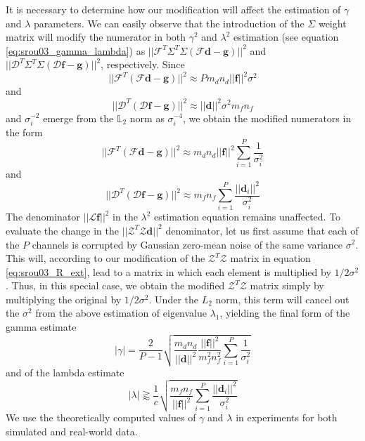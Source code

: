 \documentclass[12pt,notitlepage]{report}
\begin{document}
It is necessary to determine how our modification will affect the estimation of $\gamma$ and $\lambda$ parameters. We can easily observe that the introduction of the $\Sigma$ weight matrix will 
modify the numerator in both $\gamma^2$ and $\lambda^2$ estimation (see equation \ref{eq:srou03_gamma_lambda}) as $||\mathcal{F}^T \Sigma^T \Sigma( \mathcal{F} \mathbf{d} - \mathbf{g}) ||^2$ and $||\mathcal{D}^T \Sigma^T \Sigma( \mathcal{D} \mathbf{f} - \mathbf{g}) ||^2$, respectively. Since 
\begin{equation}
\label{eq:srou03_lambda_numer}
	||\mathcal{F}^T(\mathcal{F} \mathbf{d} - \mathbf{g}) ||^2 \approx P m_d n_d ||\mathbf{f}||^2 \sigma^2
\end{equation}
and 
\begin{equation}
\label{eq:srou03_gamma_numer}
	||\mathcal{D}^T (\mathcal{D} \mathbf{f} - \mathbf{g}) ||^2 \approx || \mathbf{d} ||^2 \sigma^2 m_f n_f
\end{equation}
and $\sigma_i^{-2}$ emerge from the $\mathbb{L}_2$ norm as $\sigma_i^{-4}$, we obtain the modified numerators in the form    
\begin{equation}
\label{eq:srou03_lambda_numer_ext}
	||\mathcal{F}^T(\mathcal{F} \mathbf{d} - \mathbf{g}) ||^2 \approx m_d n_d ||\mathbf{f}||^2 \sum_{i=1}^{P} \frac{1}{\sigma_i^2} 
\end{equation}
and 
\begin{equation}
\label{eq:srou03_gamma_numer_ext}
	||\mathcal{D}^T (\mathcal{D} \mathbf{f} - \mathbf{g}) ||^2 \approx  m_f n_f \sum_{i=1}^P \frac {|| \mathbf{d}_i ||^2}{ \sigma_i^2}
\end{equation}
The denominator $|| \mathcal{L} \mathbf{f} ||^2$ in the $\lambda^2$ estimation equation remains unaffected. To evaluate the change in the $|| \mathcal{Z}^T \mathcal{Z} \mathbf{d} ||^2$ denominator, let us first assume that each of the $P$ channels is corrupted by Gaussian zero-mean noise of the same variance $\sigma^2$. This will, according to our modification of the $\mathcal{Z}^T \mathcal{Z}$ matrix in equation \ref{eq:srou03_R_ext}, lead to a matrix in which each element is multiplied by $1/2\sigma^2$. Thus, in this special case, we obtain the modified $\mathcal{Z}^T \mathcal{Z}$ matrix simply by multiplying the original by $1/2\sigma^2$. Under the $L_2$ norm, this term will cancel out the $\sigma^2$ from the above estimation of eigenvalue $\lambda_1$, yielding the final form of the gamma estimate
\begin{equation}
\label{eq:srou03_gamma_estimate_ext}
	|\gamma| = \frac{2}{P - 1} \sqrt{ \frac{m_d n_d}{|| \mathbf{d} ||^2} \frac{||\mathbf{f}||^2}{m_f^2 n_f^2} \sum_{i=1}^{P} \frac{1}{\sigma_i^2} }
\end{equation}
and of the lambda estimate
\begin{equation}
\label{eq:srou03_lambda_estimate_ext}
	|\lambda| \gtrapprox \frac{1}{c} \sqrt{ \frac{m_f n_f}{||\mathbf{f}||^2} \sum_{i=1}^{P}\frac{||\mathbf{d}_i||^2}{\sigma_i^2}}
\end{equation}
We use the theoretically computed values of $\gamma$ and $\lambda$ in experiments for both simulated and real-world data.  
\end{document}
